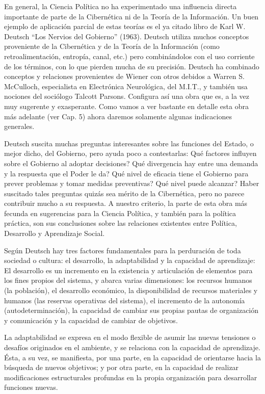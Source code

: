 \documentclass[
]{book}
\begin{document}
En general, la Ciencia Política no ha experimentado una influencia directa importante de parte de la Cibernética ni de la Teoría de la Información. Un buen ejemplo de aplicación parcial de estas teorías es el ya citado libro de Karl W. Deutsch ``Los Nervios del Gobierno'' (1963). Deutsch utiliza muchos conceptos proveniente de la Cibernética y de la Teoría de la Información (como retroalimentación, entropía, canal, etc.) pero combinándolos con el uso corriente de los términos, con lo que pierden mucha de su precisión. Deutsch ha combinado conceptos y relaciones provenientes de Wiener con otros debidos a Warren S. McCulloch, especialista en Electrónica Neurológica, del M.I.T., y también usa nociones del sociólogo Talcott Parsons. Configura así una obra que es, a la vez muy sugerente y exasperante. Como vamos a ver bastante en detalle esta obra más adelante (ver Cap. 5) ahora daremos solamente algunas indicaciones generales.

Deutsch suscita muchas preguntas interesantes sobre las funciones del Estado, o mejor dicho, del Gobierno, pero ayuda poco a contestarlas: Qué factores influyen sobre el Gobierno al adoptar decisiones? Qué divergencia hay entre una demanda y la respuesta que el Poder le da? Qué nivel de eficacia tiene el Gobierno para prever problemas y tomar medidas preventivas? Qué nivel puede alcanzar? Haber suscitado tales preguntas quizás sea mérito de la Cibernética, pero no parece contribuir mucho a su respuesta. A nuestro criterio, la parte de esta obra más fecunda en sugerencias para la Ciencia Política, y también para la política práctica, son sus conclusiones sobre las relaciones existentes entre Política, Desarrollo y Aprendizaje Social.

Según Deutsch hay tres factores fundamentales para la perduración de toda sociedad o cultura: el desarrollo, la adaptabilidad y la capacidad de aprendizaje: El desarrollo es un incremento en la existencia y articulación de elementos para los fines propios del sistema, y abarca varias dimensiones: los recursos humanos (la población), el desarrollo económico, la disponibilidad de recursos materiales y humanos (las reservas operativas del sistema), el incremento de la autonomía (autodeterminación), la capacidad de cambiar sus propias pautas de organización y comunicación y la capacidad de cambiar de objetivos.

La adaptabilidad se expresa en el modo flexible de asumir las nuevas tensiones o desafíos originados en el ambiente, y se relaciona con la capacidad de aprendizaje. Ésta, a su vez, se manifiesta, por una parte, en la capacidad de orientarse hacia la búsqueda de nuevos objetivos; y por otra parte, en la capacidad de realizar modificaciones estructurales profundas en la propia organización para desarrollar funciones nuevas.
\end{document}

